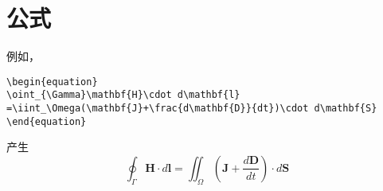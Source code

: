 \chapter{公式}

例如，
\begin{verbatim}
\begin{equation}
\oint_{\Gamma}\mathbf{H}\cdot d\mathbf{l}
=\iint_\Omega(\mathbf{J}+\frac{d\mathbf{D}}{dt})\cdot d\mathbf{S}
\end{equation}
\end{verbatim}
产生
\begin{equation}
\oint_{\Gamma}\mathbf{H}\cdot d\mathbf{l}=\iint_\Omega(\mathbf{J}+\frac{d\mathbf{D}}{dt})\cdot d\mathbf{S}
\end{equation}